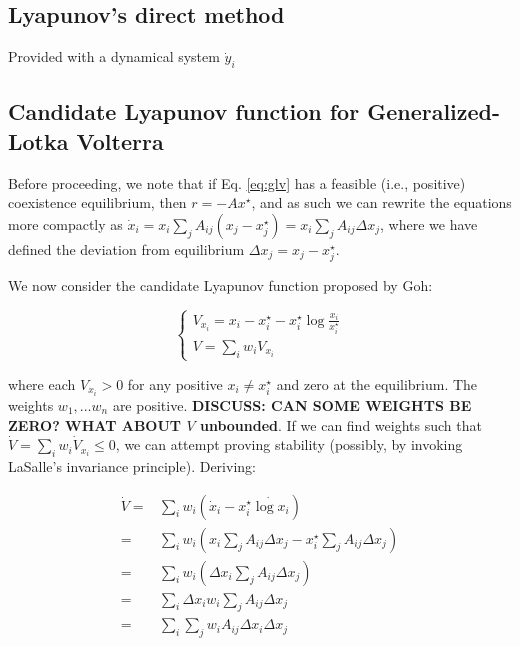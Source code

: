 \documentclass{article}
\begin{document}
\hypertarget{lyapunovs-direct-method}{%
\subsection{Lyapunov's direct method}\label{lyapunovs-direct-method}}

Provided with a dynamical system \(\dot{y}_i\)

\hypertarget{candidate-lyapunov-function-for-generalized-lotka-volterra}{%
\subsection{Candidate Lyapunov function for Generalized-Lotka
Volterra}\label{candidate-lyapunov-function-for-generalized-lotka-volterra}}

Before proceeding, we note that if Eq. \ref{eq:glv} has a feasible
(i.e., positive) coexistence equilibrium, then \(r = -A x^\star\), and
as such we can rewrite the equations more compactly as
\(\dot{x}_i = x_i \sum_{j} A_{ij} (x_j - x_j^\star) = x_i \sum_{j} A_{ij} \Delta x_j\),
where we have defined the deviation from equilibrium
\(\Delta x_j = x_j - x_j^\star\).

We now consider the candidate Lyapunov function proposed by Goh:

\begin{equation}
\label{eq:goh}
\begin{cases}
V_{x_i} = x_i - x_i^\star - x_i^\star \log \frac{x_i}{x_i^\star}\\
V = \sum_i w_i V_{x_i}
\end{cases}
\end{equation}

where each \(V_{x_i} > 0\) for any positive \(x_i \neq x_i^\star\) and
zero at the equilibrium. The weights \(w_1, \ldots w_n\) are positive.
\textbf{DISCUSS: CAN SOME WEIGHTS BE ZERO? WHAT ABOUT \(V\) unbounded}.
If we can find weights such that
\(\dot{V} = \sum_i w_i \dot{V}_{x_i} \leq 0\), we can attempt proving
stability (possibly, by invoking LaSalle's invariance principle).
Deriving:

\begin{equation}
\label{eq:gohstab}
\begin{aligned}
\dot{V} =& \sum_i w_i \left(\dot{x}_i - x_i^\star \dot{\log x_i} \right)\\
 =& \sum_i w_i \left(x_i \sum_{j} A_{ij} \Delta x_j - x_i^\star \sum_j A_{ij} \Delta x_j \right)\\
 =& \sum_i w_i \left(\Delta x_i \sum_{j} A_{ij} \Delta x_j \right)\\
 =& \sum_i \Delta x_i w_i \sum_j A_{ij} \Delta x_j\\
 =& \sum_i \sum_j w_i A_{ij} \Delta x_i \Delta x_j
\end{aligned}
\end{equation}
\end{document}
